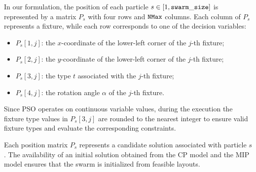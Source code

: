 In our formulation, the position of each particle \(s \in [1,\mathtt{swarm\_size}]\) is represented by a matrix \(P_s\) with four rows and \(\mathtt{NMax}\) columns. Each column of \(P_s\) represents a fixture, while each row corresponds to one of the decision variables:
\begin{itemize}
	\item $P_s[1,j]$: the $x$-coordinate of the lower-left corner of the $j$-th fixture;
	\item $P_s[2,j]$: the $y$-coordinate of the lower-left corner of the $j$-th fixture;
	\item $P_s[3,j]$: the type $t$ associated with the $j$-th fixture;
	\item $P_s[4,j]$: the rotation angle $\alpha$ of the $j$-th fixture.
\end{itemize}

Since PSO operates on continuous variable values, during the execution the fixture type values in $P_s[3,j]$ are rounded to the nearest integer to ensure valid fixture types and evaluate the corresponding constraints.

Each position matrix $P_s$ represents a candidate solution associated with particle $s$. The availability of an initial solution obtained from the CP model and the MIP model ensures that the swarm is initialized from feasible layouts.


